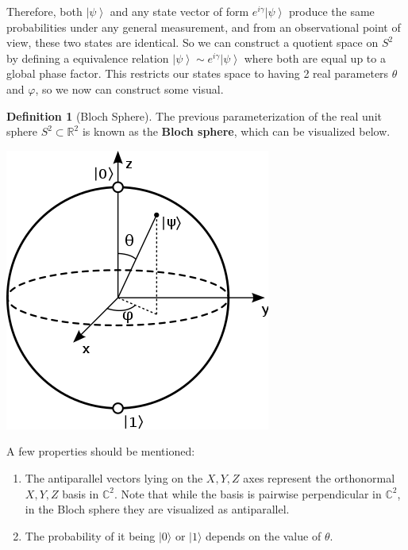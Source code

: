 \documentclass{article}
\newcommand{\ket}[1]{\ensuremath{\left|#1\right\rangle}}
\theoremstyle{definition}
\newtheorem{definition}{Definition}[section]
\begin{document}
      Therefore, both $\ket{\psi}$ and any state vector of form $e^{i \gamma} \ket{\psi}$ produce the same probabilities under any general measurement, and from an observational point of view, these two states are identical. So we can construct a quotient space on $S^2$ by defining a equivalence relation $\ket{\psi} \sim e^{i\gamma} \ket{\psi}$ where both are equal up to a global phase factor. This restricts our states space to having 2 real parameters $\theta$ and $\varphi$, so we now can construct some visual. 

      \begin{definition}[Bloch Sphere]
        The previous parameterization of the real unit sphere $S^2 \subset \mathbb{R}^2$ is known as the \textbf{Bloch sphere}, which can be visualized below. 

        \begin{center}
          \includegraphics[scale=0.4]{img/330px-Bloch_sphere.png}
        \end{center}


        A few properties should be mentioned: 
        \begin{enumerate}
          \item The antiparallel vectors lying on the $X, Y, Z$ axes represent the orthonormal $X, Y, Z$ basis in $\mathbb{C}^2$. Note that while the basis is pairwise perpendicular in $\mathbb{C}^2$, in the Bloch sphere they are visualized as antiparallel. 

          \item The probability of it being $|0\rangle$ or $|1\rangle$ depends on the value of $\theta$. 
        \end{enumerate}
      \end{definition}
\end{document}
